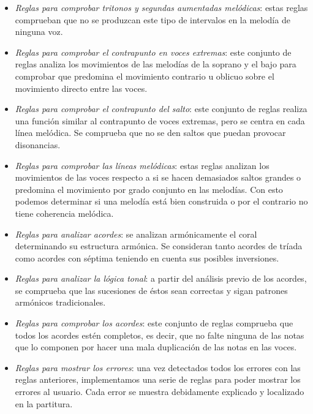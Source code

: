\begin{itemize}
	\bigskip

	\item \textit{Reglas para comprobar tritonos y segundas aumentadas melódicas}: estas reglas comprueban que no se produzcan este tipo de intervalos en la melodía de ninguna voz.

	\bigskip

	\item \textit{Reglas para comprobar el contrapunto en voces extremas}: este conjunto de reglas analiza los movimientos de las melodías de la soprano y el bajo para comprobar que predomina el movimiento contrario u oblicuo sobre el movimiento directo entre las voces.

	\bigskip

	\item \textit{Reglas para comprobar el contrapunto del salto}: este conjunto de reglas realiza una función similar al contrapunto de voces extremas, pero se centra en cada línea melódica. Se comprueba que no se den saltos que puedan provocar disonancias.

	\bigskip

	\item \textit{Reglas para comprobar las líneas melódicas}: estas reglas analizan los movimientos de las voces respecto a si se hacen demasiados saltos grandes o predomina el movimiento por grado conjunto en las melodías. Con esto podemos determinar si una melodía está bien construida o por el contrario no tiene coherencia melódica.

	\bigskip

	\item \textit{Reglas para analizar acordes}: se analizan armónicamente el coral determinando su estructura armónica. Se consideran tanto acordes de tríada como acordes con séptima teniendo en cuenta sus posibles inversiones.

	\bigskip

	\item \textit{Reglas para analizar la lógica tonal}: a partir del análisis previo de los acordes, se comprueba que las sucesiones de éstos sean correctas y sigan patrones armónicos tradicionales.

	\bigskip

	\item \textit{Reglas para comprobar los acordes}: este conjunto de reglas comprueba que todos los acordes estén completos, es decir, que no falte ninguna de las notas que lo componen por hacer una mala duplicación de las notas en las voces. 

	\bigskip

	\item \textit{Reglas para mostrar los errores}: una vez detectados todos los errores con las reglas anteriores, implementamos una serie de reglas para poder mostrar los errores al usuario. Cada error se muestra debidamente explicado y localizado en la partitura.

\end{itemize}

